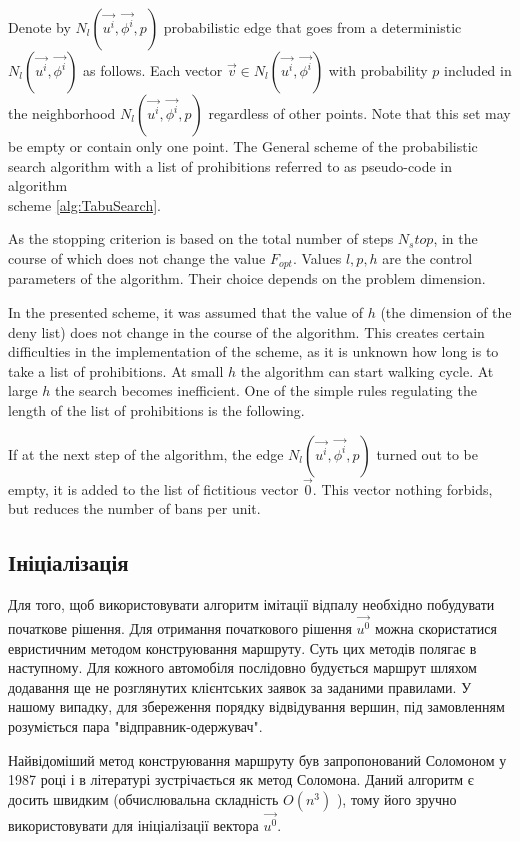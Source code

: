 \documentclass[]{TAACpaper}
\begin{document}
Denote by $N_l(\vec{u^i},\vec{\phi^i},p)$ probabilistic edge that goes from a deterministic $N_l(\vec{u^i},\vec{\phi^i})$ as follows. Each vector $\vec{v} \in N_l(\vec{u^i},\vec{\phi^i})$ with probability $p$ included in the neighborhood $N_l(\vec{u^i},\vec{\phi^i},p)$ regardless of other points. Note that this set may be empty or contain only one point. The General scheme of the probabilistic search algorithm with a list of prohibitions referred to as pseudo-code in algorithm \\
scheme \ref{alg:TabuSearch}.

As the stopping criterion is based on the total number of steps $N_stop$, in the course of which does not change the value $F_{opt}$. Values $l,p,h$ are the control parameters of the algorithm. Their choice depends on the problem dimension.

In the presented scheme, it was assumed that the value of $h$ (the dimension of the deny list) does not change in the course of the algorithm. This creates certain difficulties in the implementation of the scheme, as it is unknown how long is to take a list of prohibitions. At small $h$ the algorithm can start walking cycle. At large $h$ the search becomes inefficient. One of the simple rules regulating the length of the list of prohibitions is the following.

If at the next step of the algorithm, the edge  $N_l(\vec{u^i},\vec{\phi^i},p)$ turned out to be empty, it is added to the list of fictitious vector $\vec{0}$. This vector nothing forbids, but reduces the number of bans per unit.

\subsection{Ініціалізація}
Для того, щоб використовувати алгоритм імітації відпалу необхідно побудувати початкове рішення. Для отримання початкового рішення $\vec{u^0}$ можна скористатися евристичним методом конструювання маршруту. Суть цих методів полягає в наступному. Для кожного автомобіля послідовно будується маршрут шляхом додавання ще не розглянутих клієнтських заявок за заданими правилами. У нашому випадку, для збереження порядку відвідування вершин, під замовленням розуміється пара "відправник-одержувач".

Найвідоміший метод конструювання маршруту був запропонований Соломоном у 1987 році \cite{Cordeau2001,Braysy} і в літературі зустрічається як метод Соломона. Даний алгоритм є досить швидким (обчислювальна складність $O(n^3)$ \cite{Babb}), тому його зручно використовувати для ініціалізації вектора $\vec{u^0}$.
\end{document}
